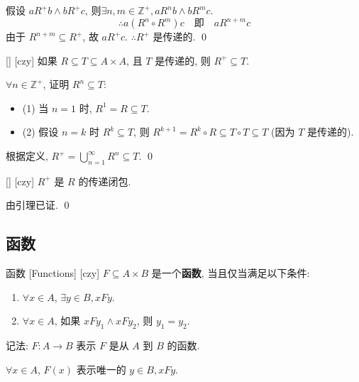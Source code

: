 \documentclass[UTF8]{ctexart}
\begin{document}
        \begin{prf}
            假设 \( a R^+ b \land b R^+ c \), 则\(\exists n, m \in \mathbb{Z}^+, a R^n b \land b R^m c \). 
            \[
            \therefore a (R^n \circ R^m) c \quad \text{即} \quad a R^{n+m} c
            \]
            由于 \( R^{n+m} \subseteq R^+ \), 故 \( a R^+ c \). \( \therefore R^+ \) 是传递的. 
            \qed
        \end{prf}

        \begin{lma}
            [UUID]
            {}
            []
            [czy]
            如果 \( R \subseteq T \subseteq A \times A \), 且 \( T \) 是传递的, 则 \( R^+ \subseteq T \). 
        \end{lma}

        \begin{prf}
            \(\forall n \in \mathbb{Z}^+ \), 证明 \( R^n \subseteq T \): 
            \begin{itemize}
                \item (1) 当 \( n = 1 \) 时, \( R^1 = R \subseteq T \). 
                \item (2) 假设 \( n = k \) 时 \( R^k \subseteq T \), 则 \( R^{k+1} = R^k \circ R \subseteq T \circ T \subseteq T \) (因为 \( T \) 是传递的). 
            \end{itemize}
            根据定义, \( R^+ = \bigcup_{n=1}^{\infty} R^n \subseteq T \). 
            \qed
        \end{prf}

        \begin{thm}
            [UUID]
            {}
            []
            [czy]
            \( R^+ \) 是 \( R \) 的传递闭包. 
        \end{thm}

        \begin{prf}
            由引理已证. 
            \qed
        \end{prf}

    \subsection{函数}

        \begin{dfn}
            [UUID]
            {函数}
            [Functions]
            [czy]
            \( F \subseteq A \times B \) 是一个\textbf{函数}, 当且仅当满足以下条件: 
            \begin{enumerate}
                \item \(\forall x \in A \), \(\exists y \in B, x F y \). 
                \item \(\forall x \in A \), 如果 \( x F y_1 \land x F y_2 \), 则 \( y_1 = y_2 \). 
            \end{enumerate}

            记法: \( F: A \rightarrow B \) 表示 \( F \) 是从 \( A \) 到 \( B \) 的函数. 

            \(\forall x \in A \), \( F(x) \) 表示唯一的 \( y \in B, x F y \). 
        \end{dfn}
\end{document}
